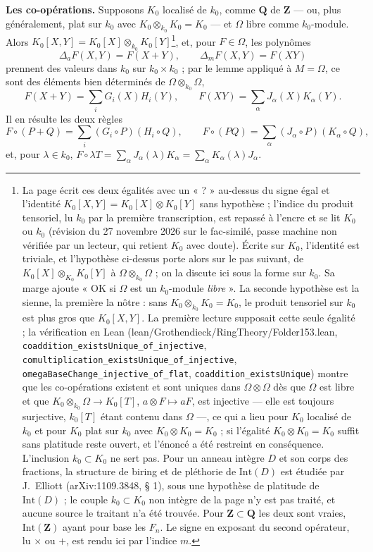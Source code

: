 \documentclass[11pt,a4paper]{article}
\begin{document}
\textbf{Les co-opérations.} Supposons $K_{0}$ localisé de $k_{0}$, comme
$\mathbf{Q}$ de $\mathbf{Z}$ --- ou, plus généralement, plat sur $k_0$ avec
$K_{0} \otimes_{k_{0}} K_{0} = K_{0}$ --- et $\Omega$ libre comme
$k_{0}$-module. Alors
$K_{0}[X, Y] = K_{0}[X] \otimes_{k_{0}} K_{0}[Y]$\footnote{La page écrit ces deux égalités avec un « ? » au-dessus du signe égal
et l'identité $K_{0}[X,Y] = K_{0}[X] \otimes K_{0}[Y]$ sans hypothèse ; l'indice
du produit tensoriel, lu $k_{0}$ par la première transcription, est repassé à
l'encre et se lit $K_{0}$ ou $k_{0}$ (révision du 27 novembre 2026 sur le
fac-similé, passe machine non vérifiée par un lecteur, qui retient $K_{0}$ avec
doute). Écrite sur $K_{0}$, l'identité est triviale, et l'hypothèse ci-dessus
porte alors sur le pas suivant, de $K_{0}[X] \otimes_{K_{0}} K_{0}[Y]$ à $\Omega
\otimes_{k_{0}} \Omega$ ; on la discute ici sous la forme sur $k_{0}$. Sa marge
ajoute « OK si $\Omega$ est un $k_{0}$-module \emph{libre} ». La
seconde hypothèse est la sienne, la première la nôtre : sans
$K_0 \otimes_{k_0} K_0 = K_0$, le produit tensoriel sur $k_{0}$ est plus gros
que $K_{0}[X,Y]$. La première lecture supposait cette seule égalité ; la
vérification en Lean (lean/Grothendieck/RingTheory/Folder153.lean,
\texttt{coaddition\_existsUnique\_of\_injective},
\texttt{comultiplication\_existsUnique\_of\_injective},
\texttt{omegaBaseChange\_injective\_of\_flat}, \texttt{coaddition\_existsUnique})
montre que les co-opérations existent et sont uniques dans $\Omega \otimes
\Omega$ dès que $\Omega$ est libre et que $K_0 \otimes_{k_0} \Omega \to
K_0[T]$, $a \otimes F \mapsto aF$, est injective --- elle est toujours
surjective, $k_0[T]$ étant contenu dans $\Omega$ ---, ce qui a lieu pour
$K_0$ localisé de $k_0$ et pour $K_0$ plat sur $k_0$ avec $K_0 \otimes K_0 =
K_0$ ; si l'égalité $K_0 \otimes K_0 = K_0$ suffit sans platitude reste
ouvert, et l'énoncé a été restreint en conséquence. L'inclusion $k_0 \subset
K_0$ ne sert pas. Pour un anneau intègre $D$ et son corps des fractions, la
structure de biring et de pléthorie de $\mathrm{Int}(D)$ est étudiée par
J.~Elliott (arXiv:1109.3848, § 1), sous une hypothèse de platitude de
$\mathrm{Int}(D)$ ; le couple $k_0 \subset K_0$ non intègre de la page n'y
est pas traité, et aucune source le traitant n'a été trouvée. Pour $\mathbf{Z} \subset
\mathbf{Q}$ les deux sont vraies, $\mathrm{Int}(\mathbf{Z})$ ayant pour base les
$F_{n}$. Le signe en exposant du second opérateur, lu $\times$ ou $+$, est rendu
ici par l'indice $m$.}, et, pour $F \in \Omega$, les
polynômes
\[
\Delta_{a} F(X, Y) = F(X + Y), \qquad \Delta_{m} F(X, Y) = F(XY)
\]
prennent des valeurs dans $k_{0}$ sur $k_{0} \times k_{0}$ ; par le lemme appliqué
à $M = \Omega$, ce sont des éléments bien déterminés de $\Omega \otimes_{k_{0}}
\Omega$,
\[
F(X + Y) = \sum_{i} G_{i}(X) H_{i}(Y),
\qquad
F(XY) = \sum_{\alpha} J_{\alpha}(X) K_{\alpha}(Y).
\]
Il en résulte les deux règles
\[
F \circ (P + Q) = \sum_{i} (G_{i} \circ P)(H_{i} \circ Q),
\qquad
F \circ (PQ) = \sum_{\alpha} (J_{\alpha} \circ P)(K_{\alpha} \circ Q),
\]
et, pour $\lambda \in k_{0}$, $F \circ \lambda T = \sum_{\alpha} J_{\alpha}(\lambda)
K_{\alpha} = \sum_{\alpha} K_{\alpha}(\lambda) J_{\alpha}$.
\end{document}
